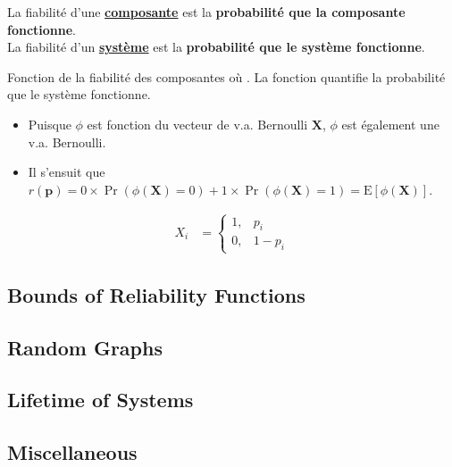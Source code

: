 \documentclass[10pt, french]{article}
\begin{document}
\begin{multicols*}{2}
\begin{definitionNOHFILL}[Fiabilité]
La fiabilité d'une \textbf{\underline{composante}} est la \textbf{probabilité que la composante fonctionne}.\\

La fiabilité d'un \textbf{\underline{système}} est la \textbf{probabilité que le système fonctionne}.
\end{definitionNOHFILL}

\begin{definitionNOHFILLsub}
Fonction de la fiabilité des composantes où . La fonction quantifie la probabilité que le système fonctionne.

\begin{itemize}
	\item	Puisque $\phi$ est fonction du vecteur de v.a. Bernoulli $\bm{X}$, $\phi$ est également une v.a. Bernoulli. 
	\item	Il s'ensuit que $r(\bm{p}) = 0 \times \Pr(\phi(\bm{X}) = 0) + 1 \times \Pr(\phi(\bm{X}) = 1) = \text{E}[\phi(\bm{X})]$.
\end{itemize}
\end{definitionNOHFILLsub}


\begin{align*}
	X_{i}
	&=	\begin{cases}
		1,	&	p_{i}	\\
		0,	&	1 - p_{i}
		\end{cases}
\end{align*}


\columnbreak
\subsection{Bounds of Reliability Functions}


\columnbreak
\subsection{Random Graphs}


\columnbreak
\subsection{Lifetime of Systems}


\columnbreak
\subsection{Miscellaneous}





\end{multicols*}
\end{document}
